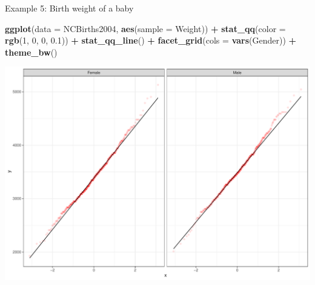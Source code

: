 \documentclass[
  ignorenonframetext,
]{beamer}
\newenvironment{Shaded}{\begin{snugshade}}{\end{snugshade}}
\newcommand{\AttributeTok}[1]{\textcolor[rgb]{0.13,0.29,0.53}{#1}}
\newcommand{\DecValTok}[1]{\textcolor[rgb]{0.00,0.00,0.81}{#1}}
\newcommand{\FloatTok}[1]{\textcolor[rgb]{0.00,0.00,0.81}{#1}}
\newcommand{\FunctionTok}[1]{\textcolor[rgb]{0.13,0.29,0.53}{\textbf{#1}}}
\newcommand{\NormalTok}[1]{#1}
\newcommand{\SpecialCharTok}[1]{\textcolor[rgb]{0.81,0.36,0.00}{\textbf{#1}}}
\begin{document}
\begin{frame}[fragile]{Example 5: Birth weight of a baby}
\protect\hypertarget{example-5-birth-weight-of-a-baby-3}{}
\tiny

\begin{Shaded}
\begin{Highlighting}[]
\FunctionTok{ggplot}\NormalTok{(}\AttributeTok{data =}\NormalTok{ NCBirths2004, }\FunctionTok{aes}\NormalTok{(}\AttributeTok{sample =}\NormalTok{ Weight)) }\SpecialCharTok{+} 
  \FunctionTok{stat\_qq}\NormalTok{(}\AttributeTok{color =} \FunctionTok{rgb}\NormalTok{(}\DecValTok{1}\NormalTok{, }\DecValTok{0}\NormalTok{, }\DecValTok{0}\NormalTok{, }\FloatTok{0.1}\NormalTok{)) }\SpecialCharTok{+} 
  \FunctionTok{stat\_qq\_line}\NormalTok{() }\SpecialCharTok{+}
  \FunctionTok{facet\_grid}\NormalTok{(}\AttributeTok{cols =} \FunctionTok{vars}\NormalTok{(Gender)) }\SpecialCharTok{+} 
  \FunctionTok{theme\_bw}\NormalTok{()}
\end{Highlighting}
\end{Shaded}

\begin{center}\includegraphics[width=0.7\linewidth,height=0.5\textheight]{Week10A_files/figure-beamer/unnamed-chunk-60-1} \end{center}
\normalsize
\end{frame}
\end{document}
